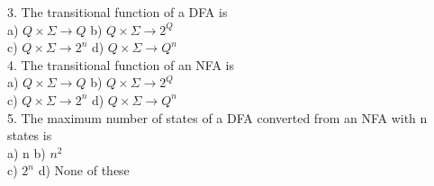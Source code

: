 \documentclass[a4,9pt]{beamer}
\begin{document}
\begin{frame}
3. The transitional function of a DFA is\\
\hspace*{0.5cm} a) $Q \times \Sigma \rightarrow Q$    \hspace*{0.7cm}  b) $Q \times \Sigma \rightarrow 2^Q$\\
\hspace*{0.5cm} c) $Q \times \Sigma \rightarrow 2^n$  \hspace*{0.7cm}  d) $Q \times \Sigma \rightarrow Q^n$\\

\pause
\vspace*{0.2cm}
4. The transitional function of an NFA is \\
\hspace*{0.5cm} a) $Q \times \Sigma \rightarrow Q$      \hspace*{0.7cm} b) $Q \times \Sigma \rightarrow 2^Q$ \\
\hspace*{0.5cm} c) $Q \times \Sigma \rightarrow 2^n$    \hspace*{0.7cm} d) $Q \times \Sigma \rightarrow Q^n$ \\

\pause
\vspace*{0.2cm}
5. The maximum number of states of a DFA converted from an NFA with n states is \\
\hspace*{0.5cm} a) n          \hspace*{0.7cm}    b) $n^2$ \\
\hspace*{0.5cm} c) $2^n$    \hspace*{0.7cm}    d) None of these \\

\vspace*{0.2cm}
\end{frame}
\end{document}

